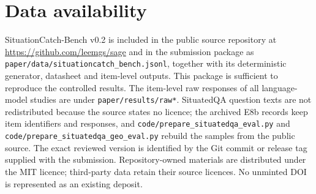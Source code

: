\documentclass[
    Numbered,         %
]{sn-jnl}
\newif\ifEFiveready
\begin{document}







\maketitle




\ifEFiveready\fi   %




\section*{Data availability}
SituationCatch-Bench v0.2 is included in the public source repository at
\url{https://github.com/leemgs/sage} and in the submission package as
\texttt{paper/data/situationcatch\_bench.jsonl}, together with its deterministic
generator, datasheet and item-level outputs. This package is sufficient to
reproduce the controlled results. The item-level raw responses of all
language-model studies are under \texttt{paper/results/raw*}. SituatedQA
question texts are not redistributed because the source states no licence; the
archived E8b records keep item identifiers and responses, and
\texttt{code/prepare\_situatedqa\_eval.py} and
\texttt{code/prepare\_situatedqa\_geo\_eval.py} rebuild the samples from the
public source. The exact reviewed version is identified
by the Git commit or release tag supplied with the submission. Repository-owned
materials are distributed under the MIT licence; third-party data retain their
source licences. No unminted DOI is represented as an existing deposit.
\end{document}
